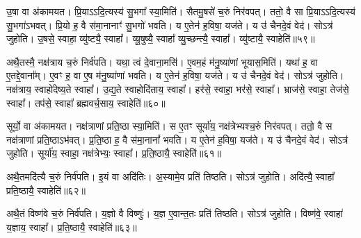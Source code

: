 उ॒षा वा अ॑कामयत।
प्रि॒या\-ऽऽदि॒त्यस्य॑ सु॒भगा᳚ स्या॒मिति॑।
सैतमु॒षसे॑ च॒रुं निर॑वपत्।
ततो॒ वै सा प्रि॒या\-ऽऽदि॒त्यस्य॑ सु॒भगा॑\-ऽभवत्।
प्रि॒यो ह॒ वै स॑मा॒नानाꣳ॑ सु॒भगो॑ भवति।
य ए॒तेन॑ ह॒विषा॒ यज॑ते।
य उ॑ चैनदे॒वं वेद॑।
सोऽत्र॑ जुहोति।
उ॒षसे॒ स्वाहा॒ व्यु॑ष्ट्यै॒ स्वाहा᳚।
व्यू॒षुष्यै॒ स्वाहा᳚ व्यु॒च्छन्त्यै॒ स्वाहा᳚।
व्यु॑ष्टायै॒ स्वाहेति॑॥५९॥\ip

अथै॒तस्मै॒ नक्ष॑त्राय च॒रुं निर्व॑पति।
यथा॒ त्वं दे॒वाना॒मसि॑।
ए॒वम॒हं म॑नु॒ष्या॑णां भूयास॒मिति॑।
यथा॑ ह॒ वा ए॒तद्दे॒वाना᳚म्।
ए॒वꣳ ह॒ वा ए॒ष म॑नु॒ष्या॑णां भवति।
य ए॒तेन॑ ह॒विषा॒ यज॑ते।
य उ॑ चैनदे॒वं वेद॑।
सोऽत्र॑ जुहोति।
नक्ष॑त्राय॒ स्वाहो॑देष्य॒ते स्वाहा᳚।
उ॒द्य॒ते स्वाहोदि॑ताय॒ स्वाहा᳚।
हर॑से॒ स्वाहा॒ भर॑से॒ स्वाहा᳚।
भ्राज॑से॒ स्वाहा॒ तेज॑से॒ स्वाहा᳚।
तप॑से॒ स्वाहा᳚ ब्रह्मवर्च॒साय॒ स्वाहेति॑॥६०॥\ip

सूर्यो॒ वा अ॑कामयत।
नक्ष॑त्राणां प्रति॒ष्ठा स्या॒मिति॑।
स ए॒तꣳ सूर्या॑य॒ नक्ष॑त्रेभ्यश्च॒रुं निर॑वपत्।
ततो॒ वै स नक्ष॑त्राणां प्रति॒ष्ठा\-ऽभ॑वत्।
प्र॒ति॒ष्ठा ह॒ वै स॑मा॒नानां᳚ भवति।
य ए॒तेन॑ ह॒विषा॒ यज॑ते।
य उ॑ चैनदे॒वं वेद॑।
सोऽत्र॑ जुहोति।
सूर्या॑य॒ स्वाहा॒ नक्ष॑त्रेभ्यः॒ स्वाहा᳚।
प्र॒ति॒ष्ठायै॒ स्वाहेति॑॥६१॥\ip

अथै॒तमदि॑त्यै च॒रुं निर्व॑पति।
इ॒यं वा अदि॑तिः।
अ॒स्यामे॒व प्रति॑ तिष्ठति।
सोऽत्र॑ जुहोति।
अदि॑त्यै॒ स्वाहा᳚ प्रति॒ष्ठायै॒ स्वाहेति॑॥६२॥\ip

अथै॒तं विष्ण॑वे च॒रुं निर्व॑पति।
य॒ज्ञो वै विष्णुः॑।
य॒ज्ञ ए॒वान्त॒तः प्रति॑ तिष्ठति।
सोऽत्र॑ जुहोति।
विष्ण॑वे॒ स्वाहा॑ य॒ज्ञाय॒ स्वाहा᳚।
प्र॒ति॒ष्ठायै॒ स्वाहेति॑॥६३॥\ip{}


